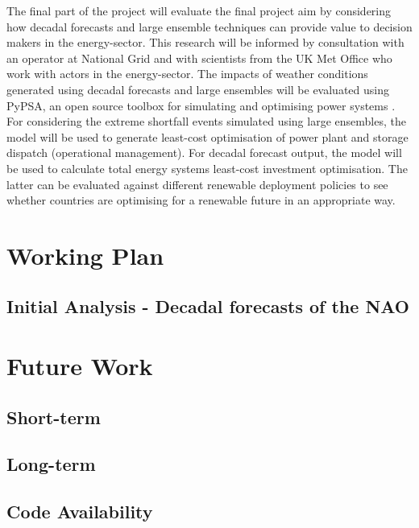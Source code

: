 \documentclass{article}
\begin{document}
The final part of the project will evaluate the final project aim by considering how decadal forecasts and large ensemble techniques can provide value to decision makers in the energy-sector. This research will be informed by consultation with an operator at National Grid and with scientists from the UK Met Office who work with actors in the energy-sector. The impacts of weather conditions generated using decadal forecasts and large ensembles will be evaluated using PyPSA, an open source toolbox for simulating and optimising power systems \parencite{PyPSA}. For considering the extreme shortfall events simulated using large ensembles, the model will be used to generate least-cost optimisation of power plant and storage dispatch (operational management). For decadal forecast output, the model will be used to calculate total energy systems least-cost investment optimisation. The latter can be evaluated against different renewable deployment policies to see whether countries are optimising for a renewable future in an appropriate way.


\section*{Working Plan}

\subsection*{Initial Analysis - Decadal forecasts of the NAO}

\section*{Future Work}

\subsection{Short-term}

\subsection{Long-term}


\subsection*{Code Availability}

\printbibliography

\end{document}

